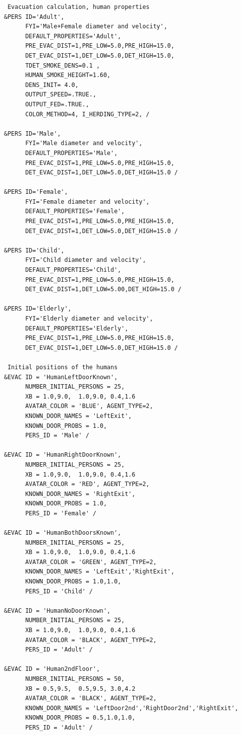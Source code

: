 \documentclass[12pt,a4paper,final,twoside]{stylevk}
\begin{document}
{\begin{verbatim}
 Evacuation calculation, human properties
&PERS ID='Adult',
      FYI='Male+Female diameter and velocity',
      DEFAULT_PROPERTIES='Adult',
      PRE_EVAC_DIST=1,PRE_LOW=5.0,PRE_HIGH=15.0,
      DET_EVAC_DIST=1,DET_LOW=5.0,DET_HIGH=15.0,
      TDET_SMOKE_DENS=0.1 ,
      HUMAN_SMOKE_HEIGHT=1.60,
      DENS_INIT= 4.0,
      OUTPUT_SPEED=.TRUE.,
      OUTPUT_FED=.TRUE.,
      COLOR_METHOD=4, I_HERDING_TYPE=2, /

&PERS ID='Male',
      FYI='Male diameter and velocity',
      DEFAULT_PROPERTIES='Male',
      PRE_EVAC_DIST=1,PRE_LOW=5.0,PRE_HIGH=15.0,
      DET_EVAC_DIST=1,DET_LOW=5.0,DET_HIGH=15.0 /

&PERS ID='Female',
      FYI='Female diameter and velocity',
      DEFAULT_PROPERTIES='Female',
      PRE_EVAC_DIST=1,PRE_LOW=5.0,PRE_HIGH=15.0,
      DET_EVAC_DIST=1,DET_LOW=5.0,DET_HIGH=15.0 /

&PERS ID='Child',
      FYI='Child diameter and velocity',
      DEFAULT_PROPERTIES='Child',
      PRE_EVAC_DIST=1,PRE_LOW=5.0,PRE_HIGH=15.0,
      DET_EVAC_DIST=1,DET_LOW=5.00,DET_HIGH=15.0 /

&PERS ID='Elderly',
      FYI='Elderly diameter and velocity',
      DEFAULT_PROPERTIES='Elderly',
      PRE_EVAC_DIST=1,PRE_LOW=5.0,PRE_HIGH=15.0,
      DET_EVAC_DIST=1,DET_LOW=5.0,DET_HIGH=15.0 /

 Initial positions of the humans
&EVAC ID = 'HumanLeftDoorKnown', 
      NUMBER_INITIAL_PERSONS = 25,
      XB = 1.0,9.0,  1.0,9.0, 0.4,1.6
      AVATAR_COLOR = 'BLUE', AGENT_TYPE=2,
      KNOWN_DOOR_NAMES = 'LeftExit',
      KNOWN_DOOR_PROBS = 1.0,
      PERS_ID = 'Male' / 

&EVAC ID = 'HumanRightDoorKnown', 
      NUMBER_INITIAL_PERSONS = 25,
      XB = 1.0,9.0,  1.0,9.0, 0.4,1.6
      AVATAR_COLOR = 'RED', AGENT_TYPE=2,
      KNOWN_DOOR_NAMES = 'RightExit',
      KNOWN_DOOR_PROBS = 1.0,
      PERS_ID = 'Female' / 

&EVAC ID = 'HumanBothDoorsKnown', 
      NUMBER_INITIAL_PERSONS = 25,
      XB = 1.0,9.0,  1.0,9.0, 0.4,1.6
      AVATAR_COLOR = 'GREEN', AGENT_TYPE=2,
      KNOWN_DOOR_NAMES = 'LeftExit','RightExit',
      KNOWN_DOOR_PROBS = 1.0,1.0,
      PERS_ID = 'Child' / 

&EVAC ID = 'HumanNoDoorKnown', 
      NUMBER_INITIAL_PERSONS = 25,
      XB = 1.0,9.0,  1.0,9.0, 0.4,1.6
      AVATAR_COLOR = 'BLACK', AGENT_TYPE=2,
      PERS_ID = 'Adult' / 

&EVAC ID = 'Human2ndFloor', 
      NUMBER_INITIAL_PERSONS = 50,
      XB = 0.5,9.5,  0.5,9.5, 3.0,4.2
      AVATAR_COLOR = 'BLACK', AGENT_TYPE=2,
      KNOWN_DOOR_NAMES = 'LeftDoor2nd','RightDoor2nd','RightExit',
      KNOWN_DOOR_PROBS = 0.5,1.0,1.0,
      PERS_ID = 'Adult' / 


\end{verbatim}}
\end{document}
